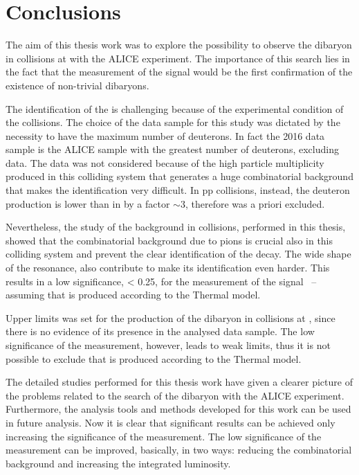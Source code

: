 %
\chapter{Conclusions} \label{sec:5}

The aim of this thesis work was to explore the possibility to observe the \dst dibaryon in \pPb collisions 
at \sctev with the ALICE experiment.
The importance of this search lies in the fact that the measurement of the \ds signal would be the first
confirmation of the existence of non-trivial dibaryons.

The identification of the \ds is challenging because of the experimental condition of the 
\pPb collisions. The choice of the \pPb data sample for this study was dictated by the necessity to have 
the maximum number of deuterons.
In fact the 2016 \pPb data sample is the ALICE sample with the greatest number of deuterons, excluding \PbPb
data. 
The \PbPb data was not considered because of the high particle multiplicity produced in this colliding
system that generates a huge combinatorial background that makes the \ds identification very difficult.
In pp collisions, instead, the deuteron production is lower than in \pPb by a factor $\sim 3$, therefore
was a priori excluded.

Nevertheless, the study of the background in \pPb collisions, performed in this thesis, showed that the
combinatorial background due to pions is crucial also in this colliding system and prevent the clear 
identification of the \ds decay. 
The wide shape of the \ds resonance, also contribute to make its identification even harder.
This results in a low significance, < 0.25, for the measurement of the \ds signal \ -- assuming that \ds
is produced according to the Thermal model.

Upper limits was set for the production of the \ds dibaryon in \pPb collisions at \sctev, since there is
no evidence of its presence in the analysed data sample. The low significance of the measurement, however, 
leads to weak limits, thus it is not possible to exclude that \ds is produced according to the Thermal
model.

The detailed studies performed for this thesis work have given a clearer picture of the 
problems related to the search of the \ds dibaryon with the ALICE experiment. 
Furthermore, the analysis tools and methods developed for this work can be used in future analysis.
Now it is clear that significant results can be achieved only increasing the significance of the
measurement.
The low significance of the measurement can be improved, basically, in two ways: reducing the 
combinatorial background and increasing the integrated luminosity.

